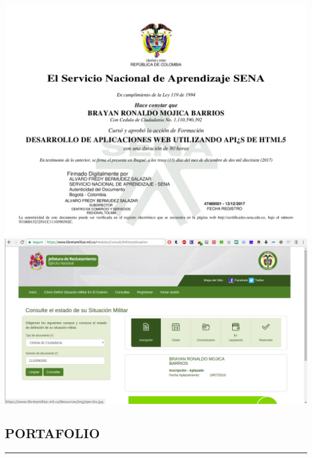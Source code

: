 \documentclass[letterpaper]{twentysecondcv} %
\begin{document}
\newpage
\makesidebarcommon
\includegraphics[width=\textwidth]{img/appwebhtml5.jpg} 
\vspace{2cm}
\includegraphics[width=\textwidth]{img/libretamil.png} 
\newpage
\makesidebarcommon
\begin{center}
\section{PORTAFOLIO}
\end{center}
\noindent\rule{1\textwidth}{1.4pt}
\end{document}
